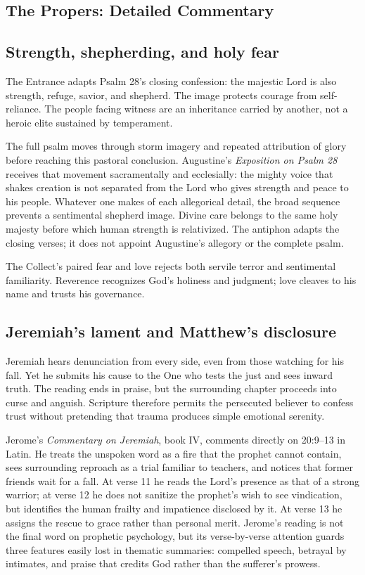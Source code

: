 \begin{deepstudy}
\clearpage
\section*{The Propers: Detailed Commentary}

\subsection*{Strength, shepherding, and holy fear\enspace{}}

The Entrance adapts Psalm 28's closing confession: the majestic Lord is also strength, refuge, savior, and shepherd. The image protects courage from self-reliance. The people facing witness are an inheritance carried by another, not a heroic elite sustained by temperament.

The full psalm moves through storm imagery and repeated attribution of glory before reaching this pastoral conclusion. Augustine's \emph{Exposition on Psalm 28} receives that movement sacramentally and ecclesially: the mighty voice that shakes creation is not separated from the Lord who gives strength and peace to his people. Whatever one makes of each allegorical detail, the broad sequence prevents a sentimental shepherd image. Divine care belongs to the same holy majesty before which human strength is relativized. The antiphon adapts the closing verses; it does not appoint Augustine's allegory or the complete psalm.

The Collect's paired fear and love rejects both servile terror and sentimental familiarity. Reverence recognizes God's holiness and judgment; love cleaves to his name and trusts his governance.

\subsection*{Jeremiah's lament and Matthew's disclosure\enspace{}}

Jeremiah hears denunciation from every side, even from those watching for his fall. Yet he submits his cause to the One who tests the just and sees inward truth. The reading ends in praise, but the surrounding chapter proceeds into curse and anguish. Scripture therefore permits the persecuted believer to confess trust without pretending that trauma produces simple emotional serenity.

Jerome's \emph{Commentary on Jeremiah}, book IV, comments directly on 20:9--13 in Latin. He treats the unspoken word as a fire that the prophet cannot contain, sees surrounding reproach as a trial familiar to teachers, and notices that former friends wait for a fall. At verse 11 he reads the Lord's presence as that of a strong warrior; at verse 12 he does not sanitize the prophet's wish to see vindication, but identifies the human frailty and impatience disclosed by it. At verse 13 he assigns the rescue to grace rather than personal merit. Jerome's reading is not the final word on prophetic psychology, but its verse-by-verse attention guards three features easily lost in thematic summaries: compelled speech, betrayal by intimates, and praise that credits God rather than the sufferer's prowess.


\end{deepstudy}

